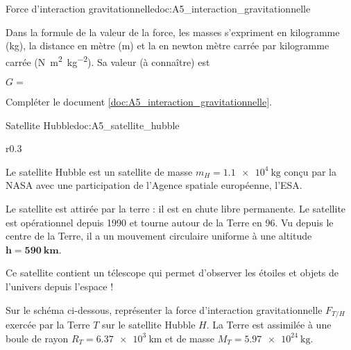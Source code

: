 \begin{doc}{Force d'interaction gravitationnelle}{doc:A5_interaction_gravitationnelle}
\begin{importants}
    Dans la formule de la valeur de la force, les masses s'expriment en kilogramme (\unit{\kg}),
    la distance en mètre (\unit{\m}) et
    la  en newton mètre carrée par kilogramme carrée (\unit{\newton \m\squared \per\kg\squared}).
    Sa valeur (à connaître) est 
    \begin{center}
      $G =$ 
    \end{center}
  \end{importants}
\end{doc}

\numeroQuestion Compléter le document \ref{doc:A5_interaction_gravitationnelle}.





\begin{doc}{Satellite Hubble}{doc:A5_satellite_hubble}
  \begin{wrapfigure}{r}{0.3\linewidth}
    \vspace*{-24pt}
    \centering
  \end{wrapfigure}
  
  Le satellite Hubble est un satellite de masse $m_H = \qty{1,1e4}{\kg}$ conçu par la NASA avec une  participation de l'Agence spatiale européenne, l'ESA.
  
  Le satellite est attirée par la terre : il est en chute libre permanente.
  Le satellite est opérationnel depuis 1990 et tourne autour de la Terre en \qty{96}{\min}.
  Vu depuis le centre de la Terre, il a un mouvement circulaire uniforme à une altitude $\mathbf{h = \qty{590}{\km}}$.
  
  Ce satellite contient un télescope qui permet d’observer les étoiles et objets de l’univers depuis l’espace !
\end{doc}

\mesure 
Sur le schéma ci-dessous, représenter la force d’interaction gravitationnelle $F_{T/H}$ exercée par la Terre $T$ sur le satellite Hubble $H$.
La Terre est assimilée à une boule de rayon $R_T = \qty{6,37e3}{\km}$ et de masse $M_T = \qty{5,97e24}{\kg}$.


